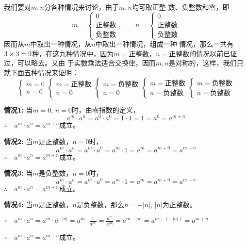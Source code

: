 我们要对$m,n$分各种情况来讨论，由于$m,n$均可取正整
数、负整数和零，即
\[m=\begin{cases}
    0\\ \text{正整数}\\ \text{负整数}
\end{cases},\qquad n=\begin{cases}
    0\\ \text{正整数}\\ \text{负整数}
\end{cases}  \]
因而从$m$中取出一种情况，从$n$中取出一种情况，组成一种
情况，那么一共有$3\times3=9$种，在这九种情况中，因为$m
=$正整数，$n=$正整数的情况以前已证过，可以略去。又由
于实数乘法适合交换律，因而$m,n$是对称的，这样，我们只
就下面五种情况来证明：
\[\begin{cases}
    m=0\\n=0
\end{cases}\begin{cases}
    m=\text{正整数}\\n=0
\end{cases}\begin{cases}
    m=\text{负整数}\\n=0
\end{cases}\begin{cases}
m=\text{正整数}\\  n=\text{负整数}
\end{cases}\begin{cases}
    m=\text{负整数}\\  n=\text{负整数}
\end{cases}  \]

\textbf{情况1:} 当$m=0$, $n=0$时，由零指数的定义，
\[a^m\cdot a^n=a^0\cdot a^0=1\cdot 1=1=a^0=a^{m+n} \]
$\therefore\quad a^m\cdot a^n=a^{m+n}$成立。

\textbf{情况2:} 当$m$是正整数，$n=0$时，
\[a^m\cdot a^n=a^m\cdot a^0=a^m\cdot 1=a^m=a^{m+0}=a^{m+n}\]
$\therefore\quad a^m\cdot a^n=a^{m+n}$成立。


\textbf{情况3:} 当$m$是负整数，$n=0$时，
\[a^m\cdot a^n=a^m\cdot a^0=a^m\cdot 1=a^m=a^{m+0}=a^{m+n}\]
$\therefore\quad a^m\cdot a^n=a^{m+n}$成立。

\textbf{情况4:} 当$m$是正整数，$n$是负整数，那么$n=-|n|$, $|n|$为正整数。

$\because\quad a^m\cdot a^n=a^m\cdot a^{-|n|}=a^m\cdot\frac{1}{a^{|n|} }=\frac{a^m}{a^{|n|}}=a^{m-|n|}=a^{m+(-|n|)}=a^{m+n} $

$\therefore\quad a^m\cdot a^n=a^{m+n}$成立。

